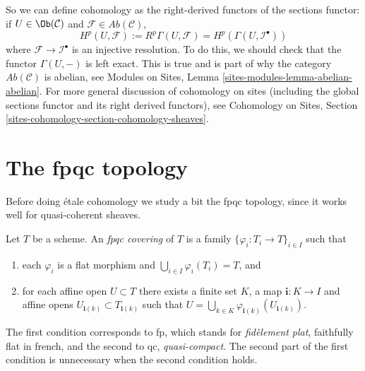 \noindent
So we can define cohomology as the right-derived functors of the
sections functor: if $U \in \Ob(\mathcal{C})$ and
$\mathcal{F} \in \textit{Ab}(\mathcal{C})$,
$$
H^p(U, \mathcal{F}) :=
R^p\Gamma(U, \mathcal{F}) =
H^p(\Gamma(U, \mathcal{I}^\bullet))
$$
where $\mathcal{F} \to \mathcal{I}^\bullet$ is an injective resolution. To do
this, we should check that the functor $\Gamma(U, -)$ is left exact. This is
true and is part of why the category $\textit{Ab}(\mathcal{C})$ is abelian,
see
Modules on Sites, Lemma \ref{sites-modules-lemma-abelian-abelian}.
For more general discussion of cohomology on sites (including the
global sections functor and its right derived functors), see
Cohomology on Sites, Section \ref{sites-cohomology-section-cohomology-sheaves}.



\section{The fpqc topology}
\label{section-fpqc}

\noindent
Before doing \'etale cohomology we study a bit the fpqc topology, since
it works well for quasi-coherent sheaves.

\begin{definition}
\label{definition-fpqc-covering}
Let $T$ be a scheme. An {\it fpqc covering} of $T$ is a family
$\{ \varphi_i : T_i \to T\}_{i \in I}$ such that
\begin{enumerate}
\item each $\varphi_i$ is a flat morphism and
$\bigcup_{i\in I} \varphi_i(T_i) = T$, and
\item for each affine open $U \subset T$ there exists a finite
set $K$, a map $\mathbf{i} : K \to I$ and affine opens
$U_{\mathbf{i}(k)} \subset T_{\mathbf{i}(k)}$ such that
$U = \bigcup_{k \in K} \varphi_{\mathbf{i}(k)}(U_{\mathbf{i}(k)})$.
\end{enumerate}
\end{definition}

\begin{remark}
\label{remark-fpqc}
The first condition corresponds to fp, which stands for
{\it fid\`element plat}, faithfully flat in french, and
the second to qc, {\it quasi-compact}. The second part of
the first condition is unnecessary when the second condition holds.
\end{remark}

